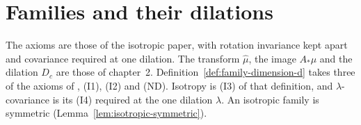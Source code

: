 \section{Families and their dilations}
\label{sec:pyramid-families}

The axioms are those of the isotropic paper, with rotation invariance kept apart and covariance
required at one dilation. The transform $\widehat\mu$, the image $A_*\mu$ and the dilation $D_c$ are
those of chapter~2. Definition~\ref{def:family-dimension-d} takes three of the axioms of
, (I1), (I2) and (ND). Isotropy is (I3) of that definition, and
$\lambda$-covariance is its (I4) required at the one dilation $\lambda$. An isotropic family is
symmetric (Lemma~\ref{lem:isotropic-symmetric}).

